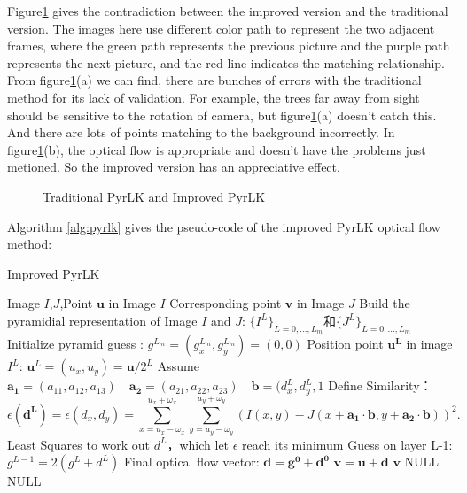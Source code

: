 Figure\ref{fig:pyrlk} gives the contradiction between the improved version and the traditional version. The images here
use different color path to represent the two adjacent frames, where the green path represents the previous picture and 
the purple path represents the next picture, and the red line indicates the matching relationship. From figure\ref{fig:pyrlk}(a)
we can find, there are bunches of errors with the traditional method for its lack of validation. For example, the trees far away
from sight should be sensitive to the rotation of camera, but figure\ref{fig:pyrlk}(a) doesn't catch this. And there are lots of
points matching to the background incorrectly. In figure\ref{fig:pyrlk}(b), the optical flow is appropriate and doesn't have the 
problems just metioned. So the improved version has an appreciative effect.
\begin{figure}[H]
	\centering
	\hspace{4em}
	\caption{Traditional PyrLK and Improved PyrLK}
	\label{fig:pyrlk}
\end{figure}


\clearpage
Algorithm \ref{alg:pyrlk} gives the pseudo-code of the improved PyrLK optical flow method:\\
\begin{algorithm}[H]
	\caption{Improved PyrLK}
	\label{alg:pyrlk}
	\begin{algorithmic}[1]
		\Require Image $I$,$J$,Point $\mathbf{u}$ in Image $I$
		\Ensure Corresponding point $\mathbf{v}$ in Image $J$
		\State Build the pyramidial representation of Image $I$ and $J$: $\{I^L\}_{L=0,...,L_m}$和$\{J^L\}_{L=0,...,L_m}$
		\State Initialize pyramid guess : $g^{L_{m}}=(g_x^{L_m}, g_y^{L_m})=(0,0)$
		\State Position point $\mathbf{u^L}$ in image $I^L$: $\mathbf{u}^L=(u_x,u_y)=\mathbf{u}/2^L$
		\State Assume $\mathbf{a_1}=(a_{11},a_{12},a_{13})\quad \mathbf{a_2}=(a_{21},a_{22},a_{23})\quad 
				\mathbf{b}=(d_x^L, d_y^L, 1$
		\State Define Similarity：
				\[ \epsilon(\mathbf{d^L})=\epsilon(d_x,d_y)=\sum_{x=u_x-\omega_x}^{u_x+\omega_x}\sum_{y=u_y-\omega_y}
				^{u_y+\omega_y}(I(x,y) - J(x+\mathbf{a_1}\cdot \mathbf{b},y+\mathbf{a_2}\cdot \mathbf{b}))^2.\]
				\State Least Squares to work out $d^L$，which let $\epsilon $ reach its minimum
		\State Guess on layer L-1: $g^{L-1}=2(g^L+d^L)$
		\EndFor
		\State Final optical flow vector: $\mathbf{d}=\mathbf{g^0}+\mathbf{d^0}$
		\State $\mathbf{v}=\mathbf{u+d}$
				\State \Return $\mathbf{v}$
			\Else
				\State \Return NULL
			\EndIf
		\Else
			\State \Return NULL
		\EndIf
	\end{algorithmic}
\end{algorithm}

